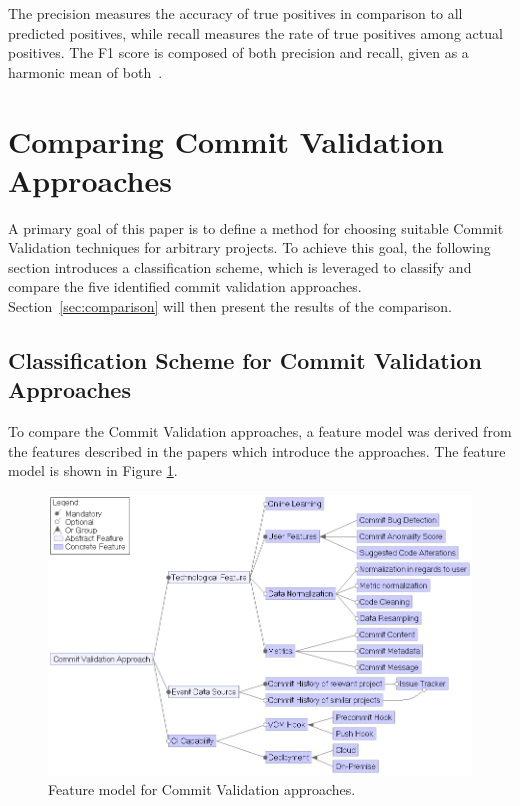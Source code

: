 The precision measures the accuracy of true positives in comparison to all predicted positives, while recall measures the rate of true positives among actual positives. The F1 score is composed of both precision and recall,
given as a harmonic mean of both~\cite{Powers2007}.


\section{Comparing Commit Validation Approaches}
\label{sec:comparingapproaches}


A primary goal of this paper is to define a method for choosing suitable Commit Validation techniques for arbitrary projects. To achieve this goal, the following section introduces a classification scheme, which is leveraged to classify and compare the five identified commit validation approaches. Section~\ref{sec:comparison} will then present the results of the comparison.

\subsection{Classification Scheme for Commit Validation Approaches}
\label{sec:scheme}

To compare the Commit Validation approaches, a feature model was derived from the features described in the papers which introduce the approaches. The feature model is shown in Figure \ref{fig:featuremodel}.

\begin{figure}[t]
	\centering
	\includegraphics[width=15cm]{images/featuremodel}
	\caption{Feature model for Commit Validation approaches.}
	\label{fig:featuremodel}
\end{figure}

